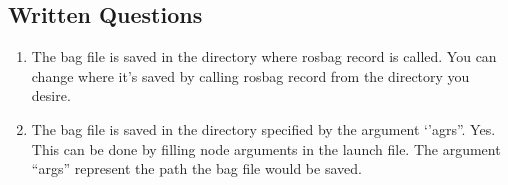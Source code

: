 \documentclass[letta4 paper]{article}
\numberwithin{equation}{section}
\newcommand{\0}{\mathbf{0}}
\begin{document}
	\subsection{Written Questions}
	
	\begin{enumerate}
		\item The bag file is saved in the directory where rosbag record is called. You can change where it’s saved by calling rosbag record from the directory you desire. 
		\item The bag file is saved in the directory specified by the argument ‘’agrs”.
Yes. This can be done by filling node arguments in the launch file. The argument “args” represent the path the bag file would be saved. 
 
	\end{enumerate}{}
\end{document}
